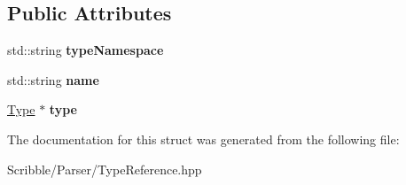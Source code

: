 \subsection*{Public Attributes}
\begin{DoxyCompactItemize}
\item 
\hypertarget{struct_type_reference_core_af3ce86d60f7311ac94a6cefb023ed643}{std\-::string {\bfseries type\-Namespace}}\label{struct_type_reference_core_af3ce86d60f7311ac94a6cefb023ed643}

\item 
\hypertarget{struct_type_reference_core_a613e7c1b074b59f1da1d96f399ff3c21}{std\-::string {\bfseries name}}\label{struct_type_reference_core_a613e7c1b074b59f1da1d96f399ff3c21}

\item 
\hypertarget{struct_type_reference_core_a57838f26f9de13b5230bec02dbb337bc}{\hyperlink{class_type}{Type} $\ast$ {\bfseries type}}\label{struct_type_reference_core_a57838f26f9de13b5230bec02dbb337bc}

\end{DoxyCompactItemize}


The documentation for this struct was generated from the following file\-:\begin{DoxyCompactItemize}
\item 
Scribble/\-Parser/Type\-Reference.\-hpp\end{DoxyCompactItemize}
